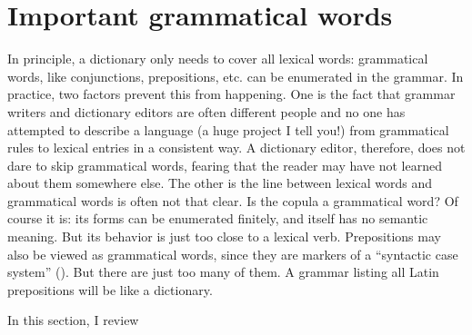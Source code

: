 \documentclass{article}
\begin{document}
\section{Important grammatical words}

In principle, a dictionary only needs to cover all lexical words:
grammatical words, like conjunctions, prepositions, etc. can be enumerated in the grammar.
In practice, two factors prevent this from happening.
One is the fact that grammar writers and dictionary editors are often different people 
and no one has attempted to describe a language (a huge project I tell you!) 
from grammatical rules to lexical entries in a consistent way.
A dictionary editor, therefore, does not dare to skip grammatical words,
fearing that the reader may have not learned about them somewhere else.
The other is the line between lexical words and grammatical words is often not that clear.
Is the copula a grammatical word?
Of course it is: its forms can be enumerated finitely,
and itself has no semantic meaning.
But its behavior is just too close to a lexical verb.
Prepositions may also be viewed as grammatical words,
since they are markers of a ``syntactic case system'' ().
But there are just too many of them.
A grammar listing all Latin prepositions will be like a dictionary.

In this section, I review 



\end{document}
